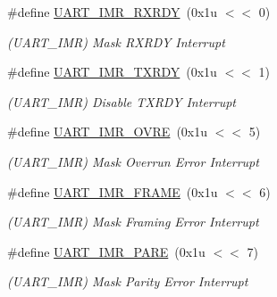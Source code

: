 \begin{DoxyCompactItemize}
\mbox{\label{group__SAMV71__UART_gadd034049fe946b9f5c0621371cb3d679}} 
\#define \mbox{\hyperlink{group__SAMV71__UART_gadd034049fe946b9f5c0621371cb3d679}{U\+A\+R\+T\+\_\+\+I\+M\+R\+\_\+\+R\+X\+R\+DY}}~(0x1u $<$$<$ 0)
\begin{DoxyCompactList}\small\item\em (U\+A\+R\+T\+\_\+\+I\+MR) Mask R\+X\+R\+DY Interrupt \end{DoxyCompactList}\item 
\mbox{\label{group__SAMV71__UART_gaa2e5fea302bac49877aec951e51e9b0c}} 
\#define \mbox{\hyperlink{group__SAMV71__UART_gaa2e5fea302bac49877aec951e51e9b0c}{U\+A\+R\+T\+\_\+\+I\+M\+R\+\_\+\+T\+X\+R\+DY}}~(0x1u $<$$<$ 1)
\begin{DoxyCompactList}\small\item\em (U\+A\+R\+T\+\_\+\+I\+MR) Disable T\+X\+R\+DY Interrupt \end{DoxyCompactList}\item 
\mbox{\label{group__SAMV71__UART_gaa82ecc6b26ab61b19a3429c3c6e5db9d}} 
\#define \mbox{\hyperlink{group__SAMV71__UART_gaa82ecc6b26ab61b19a3429c3c6e5db9d}{U\+A\+R\+T\+\_\+\+I\+M\+R\+\_\+\+O\+V\+RE}}~(0x1u $<$$<$ 5)
\begin{DoxyCompactList}\small\item\em (U\+A\+R\+T\+\_\+\+I\+MR) Mask Overrun Error Interrupt \end{DoxyCompactList}\item 
\mbox{\label{group__SAMV71__UART_ga8e344ba0f5ba7b6260231fd76e930139}} 
\#define \mbox{\hyperlink{group__SAMV71__UART_ga8e344ba0f5ba7b6260231fd76e930139}{U\+A\+R\+T\+\_\+\+I\+M\+R\+\_\+\+F\+R\+A\+ME}}~(0x1u $<$$<$ 6)
\begin{DoxyCompactList}\small\item\em (U\+A\+R\+T\+\_\+\+I\+MR) Mask Framing Error Interrupt \end{DoxyCompactList}\item 
\mbox{\label{group__SAMV71__UART_gaa0e99651b173e6d5068be7926e28f446}} 
\#define \mbox{\hyperlink{group__SAMV71__UART_gaa0e99651b173e6d5068be7926e28f446}{U\+A\+R\+T\+\_\+\+I\+M\+R\+\_\+\+P\+A\+RE}}~(0x1u $<$$<$ 7)
\begin{DoxyCompactList}\small\item\em (U\+A\+R\+T\+\_\+\+I\+MR) Mask Parity Error Interrupt \end{DoxyCompactList}\item 
$$
\end{DoxyCompactItemize}
